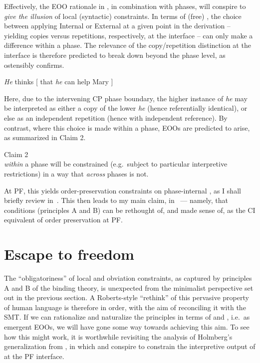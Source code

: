 \documentclass[output=paper]{langsci/langscibook}
\begin{document}
Effectively, the \gls{EOO} rationale in , in combination with
phases, will conspire to \emph{give the illusion} of local (syntactic)
constraints. In terms of (free) , the choice between applying Internal or
External  at a given point in the derivation -- yielding copies versus
repetitions, respectively, at the interface -- can only make a difference
within a phase. The relevance of the copy/repetition distinction at the
interface is therefore predicted to break down beyond the phase level, as
 ostensibly confirms.

\ea\label{ex:22.3}
    \emph{He} thinks [ that \emph{he} can help Mary ]
\z

Here, due to the intervening CP phase boundary, the higher instance of
\emph{he} may be interpreted as either a copy of the lower \emph{he} (hence
referentially identical), or else as an independent repetition (hence with
independent reference). By contrast, where this choice is made within a phase,
\glspl{EOO} are predicted to arise, as summarized in Claim 2.

\ea\label{ex:22.4}Claim 2\\
     \emph{within} a phase will be constrained (e.g.\ subject to
    particular interpretive restrictions) in a way that  \emph{across}
    phases is not.
\z

At \gls{PF}, this yields order-preservation constraints on phase-internal 
\parencite{Richards2004,Richards2007b}, as I shall briefly review
in~. This then leads to my main claim,
in~ --- namely, that  conditions (principles A and
B) can be rethought of, and made sense of, as the \gls{CI} equivalent of order
preservation at \gls{PF}.

\section{Escape to freedom}\label{sec:22.2}

The \enquote{obligatoriness} of local  and obviation constraints, as
captured by principles A and B of the binding theory, is unexpected from the
minimalist perspective set out in the previous section. A Roberts-style
\enquote{rethink} of this pervasive property of human language is therefore in order,
with the aim of reconciling it with the \gls{SMT}. If we can rationalize and
naturalize the  principles in terms of  and
, i.e.\ as emergent \glspl{EOO}, we will have gone some way towards
achieving this aim. To see how this might work, it is worthwhile revisiting the
analysis of Holmberg’s generalization from \citealt{Richards2004}, in which
 and  conspire to constrain the interpretive output
of  at the \gls{PF} interface.
\end{document}

